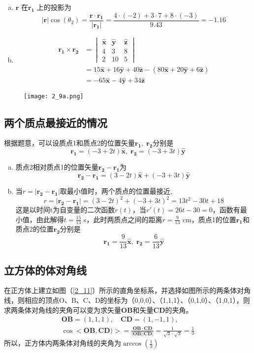 \begin{enumerate}[(a)]
	\item
	$ \bm{r} $ 在$ \bm{r_1} $ 上的投影为
	\[
	|\bm{r}|\cos(\theta_2) = \frac{\bm{r} \cdot \bm{r_1}}{|\bm{r_1}|} = \frac{4\cdot(-2) + 3\cdot7 + 8\cdot(-3)}{9.43} = -1.16	
	\]
	\item
	\[
	\begin{aligned}
	\bm{r_1} \times \bm{r_2} &=
	\begin{vmatrix}
	\bm{\hat{x}} & \bm{\hat{y}} & \bm{\hat{z}} \\
	4 & 3 & 8 \\
	2 & 10 & 5
\end{vmatrix} \\
	&= 15\bm{\hat{x}} + 16\bm{\hat{y}} + 40\bm{\hat{z}} - (80\bm{\hat{x}} + 20\bm{\hat{y}} + 6\bm{\hat{z}}) \\
	&= -65\bm{\hat{x}} - 4\bm{\hat{y}} + 34\bm{\hat{z}}
\end{aligned}
	\]
\end{enumerate}


\begin{figure}[htbp]
	\centering
	\texttt{[image: 2\_9a.png]}
	\caption{}
	\label{2_9a}
\end{figure}
\subsection{两个质点最接近的情况}
根据题意，可以设质点1和质点2的位置矢量$ \bm{r_1},\;\bm{r_2}$分别是
\[
\bm{r_1} = (-3 + 2t)\bm{\hat{x}},\; \bm{r_2} = (-3 + 3t)\bm{\hat{y}}
\]
\begin{enumerate}[(a)]
	\item
	质点2相对质点1的位置矢量$ \bm{r_2} - \bm{r_1} $为
	\[
	\bm{r_2} - \bm{r_1} = (3 - 2t)\bm{\hat{x}} + (-3 + 3t)\bm{\hat{y}}
	\]
	\item
	当$r = | \bm{r_2} - \bm{r_1} |$取最小值时，两个质点的位置最接近,
	\[
	r = |\bm{r_2} - \bm{r_1}| = (3-2t)^2 + (-3+3t)^2 = 13t^2 - 30t + 18
	\]
	这是以时间t为自变量的二次函数$r(t)$，当$r'(t) = 26t - 30 = 0$，函数有最小值，由此解得$ t = \frac{15}{13}$ s，此时两质点之间的距离$ r = \frac{9}{13}$ cm，质点1的位置$\bm{r_1}$和质点2的位置$\bm{r_2}$分别是
	\[
	\bm{r_1} = \frac{9}{13}\bm{\hat{x}},\;\bm{r_2} = \frac{6}{13}\bm{\hat{y}}
	\]
\end{enumerate}
\subsection{立方体的体对角线}
在正方体上建立如图（\ref{2_11}）所示的直角坐标系，并选择如图所示的两条体对角线，则相应的顶点O、B、C、D的坐标为（0,0,0）、（1,1,1）、（0,1,0）、（1,0,1），则求两条体对角线的夹角可以变为求矢量$\bm{OB}$和矢量$\bm{CD}$的夹角。
\[
\begin{aligned}
\bm{OB} = (1,1,1),\quad \bm{CD} = (1,-1,1),\\
\cos<\bm{OB},\bm{CD})>= \frac{\bm{OB}\cdot\bm{CD}}{|\bm{OB}| |\bm{CD}|} = \frac{1}{\sqrt{3}\cdot \sqrt{3}} = \frac{1}{3}
\end{aligned}
\]
所以，正方体内两条体对角线的夹角为$\arccos\left(\frac{1}{3}\right)$


